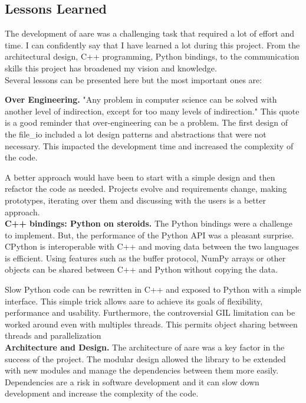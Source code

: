 \begin{spacing}{1.2}
\section*{Lessons Learned}
The development of aare was a challenging task that required a lot of effort and time.
I can confidently say that I have learned a lot during this project. From the architectural 
design, C++ programming, Python bindings, to the communication skills this project has
broadened my vision and knowledge.\\

Several lessons can be presented here but the most important ones are:

\textbf{Over Engineering.} "Any problem in computer science can be solved with another
level of indirection, except for too many levels of indirection." This quote is a good
reminder that over-engineering can be a problem. The first design of the file\_io 
included a lot design patterns and abstractions that were not necessary. This impacted 
the development time and increased the complexity of the code.

A better approach would have been to start with a simple design and then refactor the
code as needed. Projects evolve and requirements change, making prototypes, iterating 
over them and discussing with the users is a better approach.\\

\textbf{C++ bindings: Python on steroids.} The Python bindings were a challenge to implement. But, 
the performance of the Python API was a pleasant surprise. CPython is interoperable with C++
and moving data between the two languages is efficient. Using features such as the buffer
protocol, NumPy arrays or other objects can be shared between C++ and Python without 
copying the data. 

Slow Python code can be rewritten in C++ and exposed to Python with a simple interface.
This simple trick allows aare to achieve its goals of flexibility, performance and usability.
Furthermore, the controversial GIL limitation can be worked around even with multiples threads.
This permits object sharing between threads and parallelization\\

\textbf{Architecture and Design.} The architecture of aare was a key factor in the success of the project.
The modular design allowed the library to be extended with new modules and manage 
the dependencies between them more easily. Dependencies are a risk in software development
and it can slow down development and increase the complexity of the code. 


\end{spacing}
